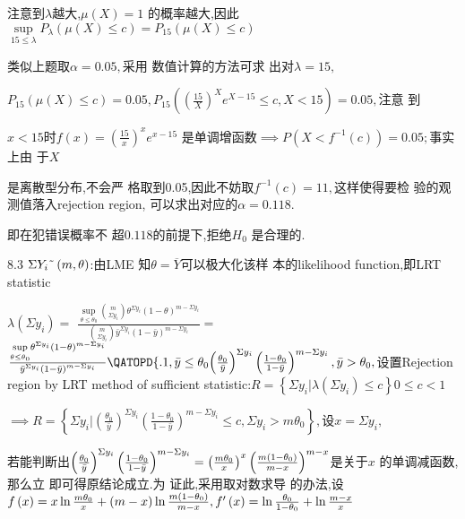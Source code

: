 \documentclass{article}
\begin{document}
注意到$\lambda $越大,$\mu \left( X\right) =1$%
的概率越大,因此$\underset{15\leq
\lambda }{\sup }P_{\lambda }\left( \mu \left( X\right) \leq c\right)
=P_{15}\left( \mu \left( X\right) \leq c\right) $

类似上题取$\alpha =0.05,$采用%
数值计算的方法可求%
出对$\lambda =15,$

$P_{15}\left( \mu \left( X\right) \leq c\right) =0.05,P_{15}\left( \left( 
\frac{15}{X}\right) ^{X}e^{X-15}\leq c,X<15\right) =0.05,$注意%
到

$x<15$时$f\left( x\right) =\left( \frac{15}{x}\right) ^{x}e^{x-15}$%
是单调增函数$\implies P\left(
X<f^{-1}\left( c\right) \right) =0.05;$事实上由%
于$X$

是离散型分布,不会严%
格取到0.05,因此不妨取$%
f^{-1}\left( c\right) =11,$这样使得要检%
验的观测值落入rejection region,%
可以求出对应的$\alpha =0.118.$

\bigskip 即在犯错误概率不%
超$0.118$的前提下,拒绝$H_{0}$%
是合理的.

8.3 $\Sigma Y_{i}\symbol{126}\left( m,\theta \right) $:由LME 知$%
\theta =\overline{Y}$可以极大化该样%
本的likelihood function,即LRT statistic

$\lambda \left( \Sigma y_{i}\right) =$ $\frac{\underset{\theta \leq \theta
_{0}}{\sup }\binom{m}{\Sigma y_{i}}\theta ^{\Sigma y_{i}}\left( 1-\theta
\right) ^{m-\Sigma y_{i}}}{\binom{m}{\Sigma y_{i}}\bar{y}^{\Sigma
y_{i}}\left( 1-\bar{y}\right) ^{m-\Sigma y_{i}}}=$ $\frac{\underset{\theta
\leq \theta _{0}}{\sup }\theta ^{\Sigma y_{i}}\left( 1-\theta \right)
^{m-\Sigma y_{i}}}{\bar{y}^{\Sigma y_{i}}\left( 1-\bar{y}\right) ^{m-\Sigma
y_{i}}}\QATOPD\{ . {1,\bar{y}\leq \theta _{0}}{\left( \frac{\theta _{0}}{%
\bar{y}}\right) ^{\Sigma y_{i}}\left( \frac{1-\theta _{0}}{1-\bar{y}}\right)
^{m-\Sigma y_{i}},\bar{y}>\theta _{0}},$设置Rejection region by
LRT method of sufficient statistic:$R=\left\{ \Sigma y_{i}|\lambda \left(
\Sigma y_{i}\right) \leq c\right\} 0\leq c<1$

$\implies R=\left\{ \Sigma y_{i}|\left( \frac{\theta _{0}}{\bar{y}}\right)
^{\Sigma y_{i}}\left( \frac{1-\theta _{0}}{1-\bar{y}}\right) ^{m-\Sigma
y_{i}}\leq c,\Sigma y_{i}>m\theta _{0}\right\} ,$设$x=\Sigma y_{i},$

若能判断出$\left( \frac{\theta _{0}}{\bar{y}}%
\right) ^{\Sigma y_{i}}\left( \frac{1-\theta _{0}}{1-\bar{y}}\right)
^{m-\Sigma y_{i}}=\left( \frac{m\theta _{0}}{x}\right) ^{x}\left( \frac{%
m\left( 1-\theta _{0}\right) }{m-x}\right) ^{m-x}$是关于$x$%
的单调减函数,那么立%
即可得原结论成立.为%
证此,采用取对数求导%
的办法,设$f\left( x\right) =x\ln \frac{m\theta _{0}}{%
x}+\left( m-x\right) \ln \frac{m\left( 1-\theta _{0}\right) }{m-x},f^{\prime
}\left( x\right) =\ln \frac{\theta _{0}}{1-\theta _{0}}+\ln \frac{m-x}{x}$
\end{document}
